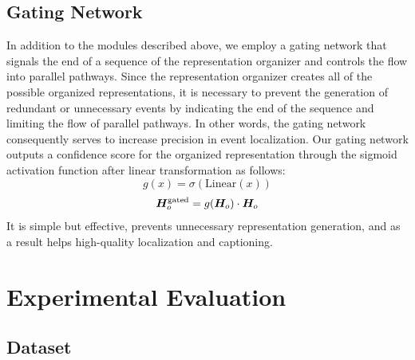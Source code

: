 \subsection{Gating Network}
\label{subsec:method-gating_network}
In addition to the modules described above, we employ a gating network that signals the end of a sequence of the representation organizer and controls the flow into parallel pathways.
Since the representation organizer creates all of the possible organized representations, it is necessary to prevent the generation of redundant or unnecessary events by indicating the end of the sequence and limiting the flow of parallel pathways.
In other words, the gating network consequently serves to increase precision in event localization.
Our gating network outputs a confidence score for the organized representation through the sigmoid activation function after linear transformation as follows:
\begin{equation}
  g(x) = \sigma (\text{Linear}(x))
\end{equation}
\begin{equation}
  \bm{H}_o^{\text{gated}} = g(\bm{H}_o) \cdot \bm{H}_o
  \label{eq:gating_network}
\end{equation}
It is simple but effective, prevents unnecessary representation generation, and as a result helps high-quality localization and captioning.

\section{Experimental Evaluation}
\subsection{Dataset}
\label{subsec:experiments-dataset}

